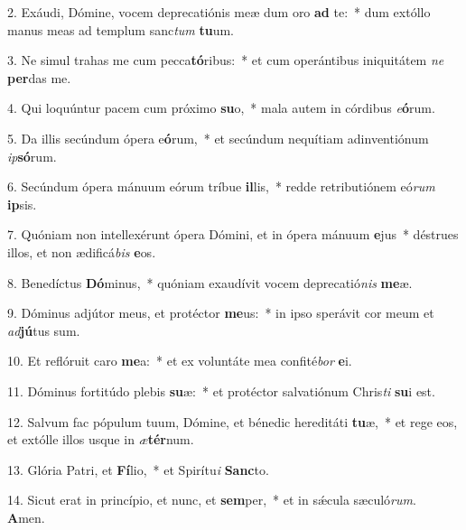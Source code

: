 2. Exáudi, Dómine, vocem deprecatiónis meæ dum oro \textbf{ad} te:~*  dum extóllo manus meas ad templum sanc\textit{tum} \textbf{tu}um.\

3. Ne simul trahas me cum pecca\textbf{tó}ribus:~*  et cum operántibus iniquitátem \textit{ne} \textbf{per}das me.\

4. Qui loquúntur pacem cum próximo \textbf{su}o,~*  mala autem in córdibus \textit{e}\textbf{ó}rum.\

5. Da illis secúndum ópera e\textbf{ó}rum,~*  et secúndum nequítiam adinventiónum \textit{ip}\textbf{só}rum.\

6. Secúndum ópera mánuum eórum tríbue \textbf{il}lis,~*  redde retributiónem eó\textit{rum} \textbf{ip}sis.\

7. Quóniam non intellexérunt ópera Dómini, et in ópera mánuum \textbf{e}jus~*  déstrues illos, et non ædificá\textit{bis} \textbf{e}os.\

8. Benedíctus \textbf{Dó}minus,~*  quóniam exaudívit vocem deprecatió\textit{nis} \textbf{me}æ.\

9. Dóminus adjútor meus, et protéctor \textbf{me}us:~*  in ipso sperávit cor meum et \textit{ad}\textbf{jú}tus sum.\

10. Et reflóruit caro \textbf{me}a:~*  et ex voluntáte mea confité\textit{bor} \textbf{e}i.\

11. Dóminus fortitúdo plebis \textbf{su}æ:~*  et protéctor salvatiónum Chris\textit{ti} \textbf{su}i est.\

12. Salvum fac pópulum tuum, Dómine, et bénedic hereditáti \textbf{tu}æ,~*  et rege eos, et extólle illos usque in \textit{æ}\textbf{tér}num.\

13. Glória Patri, et \textbf{Fí}lio,~*  et Spirítu\textit{i} \textbf{Sanc}to.\

14. Sicut erat in princípio, et nunc, et \textbf{sem}per,~*  et in sǽcula sæculó\textit{rum}. \textbf{A}men.\

